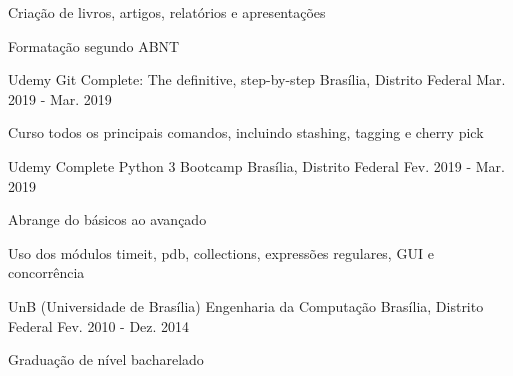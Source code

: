 \begin{cventries}
{\begin{cvitems}
				\item {Criação de livros, artigos, relatórios e apresentações}
				\item {Formatação segundo ABNT}
			\end{cvitems}
		}
	\cventry
		{Udemy} %
		{Git Complete: The definitive, step-by-step} %
		{Brasília, Distrito Federal} %
		{Mar. 2019 - Mar. 2019} %
		{
			\begin{cvitems} %
				\item {Curso todos os principais comandos, incluindo stashing, tagging e cherry pick}
			\end{cvitems}
		}
	\cventry
		{Udemy} %
		{Complete Python 3 Bootcamp} %
		{Brasília, Distrito Federal} %
		{Fev. 2019 - Mar. 2019} %
		{
			\begin{cvitems} %
				\item {Abrange do básicos ao avançado}
				\item {Uso dos módulos timeit, pdb, collections, expressões regulares, GUI e concorrência}
			\end{cvitems}
		}
	\cventry
		{UnB (Universidade de Brasília)} %
		{Engenharia da Computação} %
		{Brasília, Distrito Federal} %
		{Fev. 2010 - Dez. 2014} %
		{
			\begin{cvitems}
				\item  {Graduação de nível bacharelado}
			\end{cvitems}
		}
	
\end{cventries}